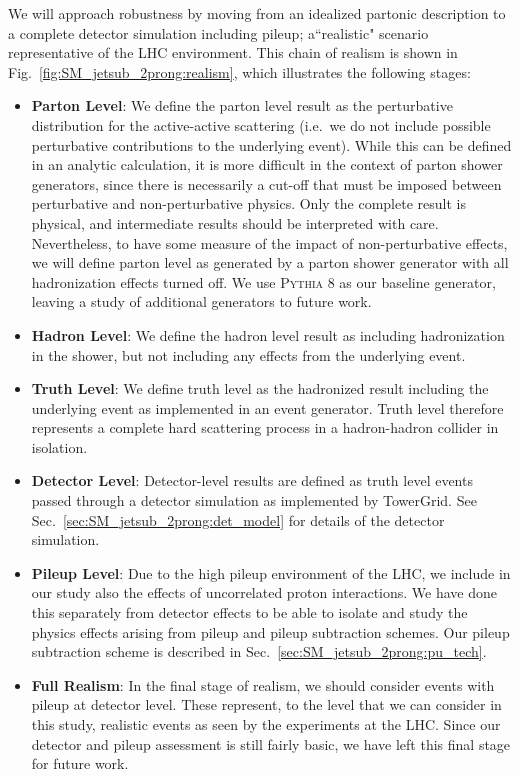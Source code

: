 We will approach robustness by moving from an idealized partonic description to a complete detector simulation including pileup; a``realistic" scenario representative of the LHC environment.
%
This chain of realism is shown in Fig.~\ref{fig:SM_jetsub_2prong:realism}, which illustrates the following stages:
%
\begin{itemize}
\item {\bf Parton Level}: We define the parton level result as the
  perturbative distribution for the active-active scattering (i.e.\ we
  do not include possible perturbative contributions to the underlying
  event).
  While this can be defined in an analytic calculation, it is
  more difficult in the context of parton shower generators, since
  there is necessarily a cut-off that must be imposed between
  perturbative and non-perturbative physics.
  Only the complete result
  is physical, and intermediate results should be interpreted with
  care.
  Nevertheless, to have some measure of the impact of
  non-perturbative effects, we will define parton level as generated
  by a parton shower generator with all hadronization effects turned
  off.
  We use \textsc{Pythia 8} \cite{Sjostrand:2006za,Sjostrand:2007gs} as our baseline generator, leaving a study of additional generators to future work.
%
\item {\bf Hadron Level}: We define the hadron level result as including hadronization in the shower, but not including any effects from the underlying event.
%
\item {\bf Truth Level}:  We define truth level as the hadronized result including the underlying event as implemented in an event generator.
%
Truth level therefore represents a complete hard scattering process in a hadron-hadron collider in isolation.
%
\item {\bf Detector Level}: Detector-level results are defined as truth level events passed through a detector simulation as implemented by TowerGrid.  See Sec.~\ref{sec:SM_jetsub_2prong:det_model} for details of the detector simulation.
%
\item {\bf Pileup Level}: Due to the high pileup environment of the LHC, we include in our study also the effects of uncorrelated proton interactions. We have done this separately from detector effects to be able to isolate and study the physics effects arising from pileup and pileup subtraction schemes. Our pileup subtraction scheme is described in Sec.~\ref{sec:SM_jetsub_2prong:pu_tech}.
%
\item {\bf Full Realism}: In the final stage of realism, we should consider events with pileup at detector
  level.
  These represent, to the level that we can consider in this
  study, realistic events as seen by the experiments at the
  LHC.
  Since our detector and pileup assessment is still fairly basic, we
  have left this final stage for future work.
\end{itemize}

